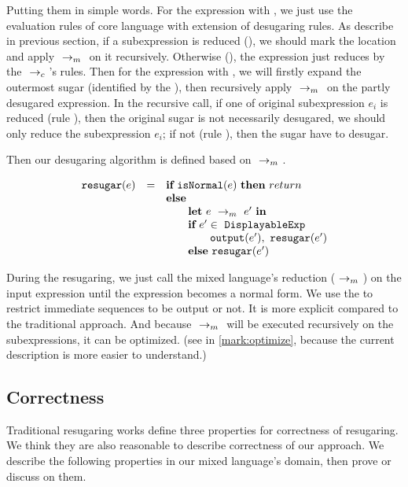 Putting them in simple words. For the expression with , we just use the evaluation rules of core language with extension of desugaring rules. As describe in previous section, if a  subexpression is reduced (), we should mark the location and apply $~\rightarrow_m~$ on it recursively. Otherwise (), the expression just reduces by the $~\rightarrow_c~$'s rules.
Then for the expression with , we will firstly expand the outermost sugar (identified by the ), then recursively apply $~\rightarrow_m~$ on the partly desugared expression. In the recursive call, if one of original subexpression $e_i$ is reduced (rule ), then the original sugar is not necessarily desugared, we should only reduce the subexpression $e_i$; if not (rule ), then the sugar have to desugar.



Then our desugaring algorithm is defined based on $~\rightarrow_m~$.

\[
\begin{array}{llll}
\mbox{\tt resugar} (e) &=& \mbox{\rm \bf if}~\mbox{\tt isNormal}(e)~\mbox{\rm \bf then}~return\\
              & & \mbox{\rm \bf else}~\\
							& & \qquad \mbox{\rm \bf let}~e ~\rightarrow_m~e'~\mbox{\rm \bf in}\\
							& & \qquad \mbox{\rm \bf if}~e' \in~\mbox{\tt DisplayableExp} \\
							& & \qquad \qquad \mbox{\tt output}(e'),~\mbox{\tt resugar}(e')\\
							& & \qquad \mbox{\rm \bf else}~\mbox{\tt resugar}(e')
\end{array}
\]

During the resugaring, we just call the mixed language's reduction ($~\rightarrow_m~$) on the input expression until the expression becomes a normal form. We use the  to restrict immediate sequences to be output or not. It is more explicit compared to the traditional approach. And because $~\rightarrow_m~$ will be executed recursively on the subexpressions, it can be optimized. (see in \ref{mark:optimize}, because the current description is more easier to understand.)

\subsection{Correctness}
\label{mark:correct}

Traditional resugaring works\cite{resugaring,hygienic} define three properties for correctness of resugaring. We think they are also reasonable to describe correctness of our approach. We describe the following properties in our mixed language's domain, then prove or discuss on them.

